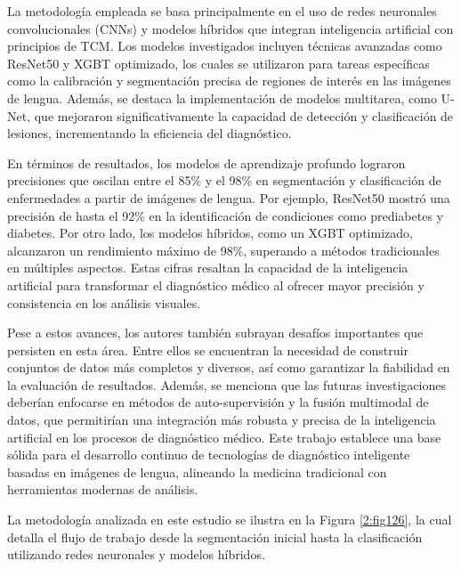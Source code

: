 La metodología empleada se basa principalmente en el uso de redes neuronales convolucionales (CNNs) y modelos híbridos que integran inteligencia artificial con principios de TCM. Los modelos investigados incluyen técnicas avanzadas como ResNet50 y XGBT optimizado, los cuales se utilizaron para tareas específicas como la calibración y segmentación precisa de regiones de interés en las imágenes de lengua. Además, se destaca la implementación de modelos multitarea, como U-Net, que mejoraron significativamente la capacidad de detección y clasificación de lesiones, incrementando la eficiencia del diagnóstico.  

En términos de resultados, los modelos de aprendizaje profundo lograron precisiones que oscilan entre el 85\% y el 98\% en segmentación y clasificación de enfermedades a partir de imágenes de lengua. Por ejemplo, ResNet50 mostró una precisión de hasta el 92\% en la identificación de condiciones como prediabetes y diabetes. Por otro lado, los modelos híbridos, como un XGBT optimizado, alcanzaron un rendimiento máximo de 98\%, superando a métodos tradicionales en múltiples aspectos. Estas cifras resaltan la capacidad de la inteligencia artificial para transformar el diagnóstico médico al ofrecer mayor precisión y consistencia en los análisis visuales.

Pese a estos avances, los autores también subrayan desafíos importantes que persisten en esta área. Entre ellos se encuentran la necesidad de construir conjuntos de datos más completos y diversos, así como garantizar la fiabilidad en la evaluación de resultados. Además, se menciona que las futuras investigaciones deberían enfocarse en métodos de auto-supervisión y la fusión multimodal de datos, que permitirían una integración más robusta y precisa de la inteligencia artificial en los procesos de diagnóstico médico. Este trabajo establece una base sólida para el desarrollo continuo de tecnologías de diagnóstico inteligente basadas en imágenes de lengua, alineando la medicina tradicional con herramientas modernas de análisis.  

La metodología analizada en este estudio se ilustra en la Figura \ref{2:fig126}, la cual detalla el flujo de trabajo desde la segmentación inicial hasta la clasificación utilizando redes neuronales y modelos híbridos.

